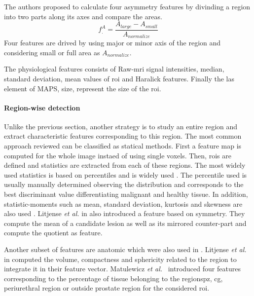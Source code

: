 The authors proposed to calculate four asymmetry features by divinding a region into two parts along its axes and compare the areas. 
\begin{equation}
  f^{A}_{.} = \frac{A_{large} - A_{small}}{A_{normalize}}
\end{equation}
\noindent Four features are drived by using major or minor axis of the region and considering small or full area as $A_{normalize}$.

The physiological features consists of Raw-\ac{mri} signal intensities, median, standard deviation, mean values of \ac{roi} and Haralick features. 
Finally the las element of MAPS, size, represent the size of the \ac{roi}.


\paragraph{Region-wise detection}

Unlike the previous section, another strategy is to study an entire region and extract characteristic features corresponding to this region.
The most common approach reviewed can be classified as statical methods.
First a feature map is computed for the whole image instaed of using single voxels.
Then, \acp{roi} are defined and statistics are extracted from each of these regions.
The most widely used statistics is based on percentiles and is widely used \cite{Antic2013,Litjens2011,Litjens2012,Litjense2014,Peng2013,Tiwari2009a,Tiwari2010,Tiwari2013,Viswanath2008,Viswanath2008a,Viswanath2011,Viswanath2012,Vos2008,Vos2008a,Vos2010,Vos2012}.
The percentile used is usually manually determined observing the distribution and corresponds to the best discriminant value differentiating malignant and healthy tissue.
In addition, statistic-moments such as mean, standard deviation, kurtosis and skewness are also used \cite{Ampeliotis2007,Ampeliotis2008,Antic2013,Niaf2011,Niaf2012,Peng2013}.
Litjense \textit{et al.} in \cite{Litjense2014} also introduced a feature based on symmetry.
They compute the mean of a candidate lesion as well as its mirrored counter-part and compute the quotient as feature.

Another subset of features are anatomic which were also used in \cite{Litjens2012,Litjense2014,Matulewicz2013}. 
Litjense \textit{et al.} in \cite{Litjense2012, Litjense2014} computed the volume, compactness and sphericity related to the region to integrate it in their feature vector.
Matulewicz \textit{et al.}~\cite{Matulewicz2013} introduced four features corresponding to the percentage of tissue belonging to the regions\ac{pz}, \ac{cg}, periurethral region or outside prostate region for the considered \ac{roi}.

